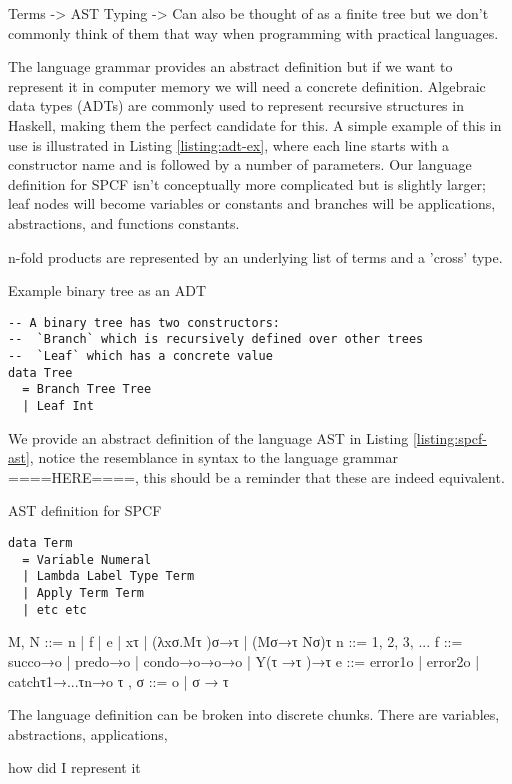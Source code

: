 \documentclass[12pt,a4paper]{report}
\theoremstyle{definition}
\theoremstyle{remark}
\begin{document}
Terms -> AST
Typing -> Can also be thought of as a finite tree but we don't commonly think of them that way when programming with practical languages.

The language grammar provides an abstract definition but if we want to represent it in computer memory we will need a concrete definition. Algebraic data types (ADTs) are commonly used to represent recursive structures in Haskell, making them the perfect candidate for this. A simple example of this in use is illustrated in Listing \ref{listing:adt-ex}, where each line starts with a constructor name and is followed by a number of parameters. Our language definition for SPCF isn't conceptually more complicated but is slightly larger; leaf nodes will become variables or constants and branches will be applications, abstractions, and functions constants. 

n-fold products are represented by an underlying list of terms and a 'cross' type.

\begin{listing}[!ht]
\caption{Example binary tree as an ADT}
\begin{verbatim}
-- A binary tree has two constructors:
--  `Branch` which is recursively defined over other trees
--  `Leaf` which has a concrete value
data Tree
  = Branch Tree Tree 
  | Leaf Int
\end{verbatim}
\label{listing:adt-ex}
\end{listing}

We provide an abstract definition of the language AST in Listing \ref{listing:spcf-ast}, notice the resemblance in syntax to the language grammar ====HERE====, this should be a reminder that these are indeed equivalent.

\begin{listing}[!ht]
\caption{AST definition for SPCF}
\begin{verbatim}
data Term
  = Variable Numeral 
  | Lambda Label Type Term
  | Apply Term Term
  | etc etc
\end{verbatim}
\label{listing:spcf-ast}
\end{listing}


M, N ::= n | f | e | xτ | (λxσ.Mτ )σ→τ | (Mσ→τ Nσ)τ
n ::= 1, 2, 3, ...
f ::= succo→o | predo→o | condo→o→o→o | Y(τ →τ )→τ
e ::= error1o | error2o | catchτ1→...τn→o
τ , σ ::= o | σ → τ

The language definition can be broken into discrete chunks. There are variables, abstractions, applications, 

how did I represent it
\end{document}
